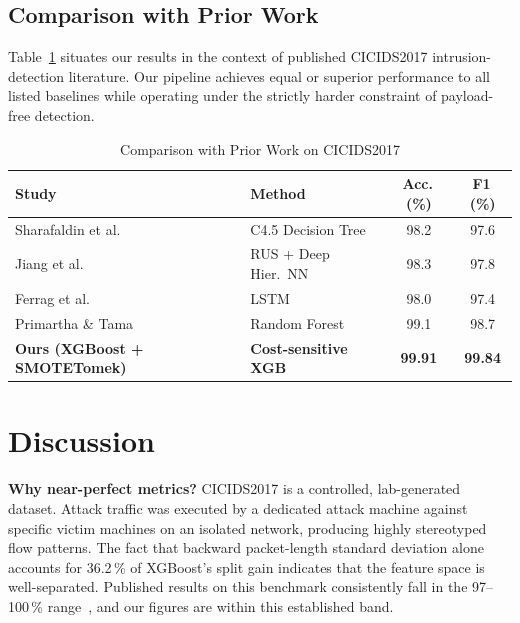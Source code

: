 \documentclass[conference]{IEEEtran}
\begin{document}
\subsection{Comparison with Prior Work}

Table~\ref{tab:comparison} situates our results in the context of
published CICIDS2017 intrusion-detection literature.  Our pipeline
achieves equal or superior performance to all listed baselines while
operating under the strictly harder constraint of payload-free
detection.

\begin{table}[ht]
\caption{Comparison with Prior Work on CICIDS2017}
\label{tab:comparison}
\centering
\setlength{\tabcolsep}{3pt}
\begin{tabular}{llcc}
\toprule
\textbf{Study} & \textbf{Method} & \textbf{Acc.\,(\%)} & \textbf{F1\,(\%)} \\
\midrule
Sharafaldin et al.~\cite{sharafaldin2018} & C4.5 Decision Tree  & 98.2 & 97.6 \\
Jiang et al.~\cite{jiang2020}             & RUS + Deep Hier.\ NN& 98.3 & 97.8 \\
Ferrag et al.~\cite{ferrag2020}           & LSTM                & 98.0 & 97.4 \\
Primartha \& Tama~\cite{primartha2017}    & Random Forest       & 99.1 & 98.7 \\
\midrule
\textbf{Ours (XGBoost + SMOTETomek)}      & \textbf{Cost-sensitive XGB}
                                          & \textbf{99.91} & \textbf{99.84} \\
\bottomrule
\end{tabular}
\end{table}

\section{Discussion}
\label{sec:discussion}

\textbf{Why near-perfect metrics?}
CICIDS2017 is a controlled, lab-generated dataset.  Attack traffic was
executed by a dedicated attack machine against specific victim machines
on an isolated network, producing highly stereotyped flow patterns.
The fact that backward packet-length standard deviation alone accounts
for 36.2\,\% of XGBoost's split gain indicates that the feature space
is well-separated.  Published results on this benchmark
consistently fall in the 97--100\,\% range~\cite{ferrag2020}, and our
figures are within this established band.
\end{document}
